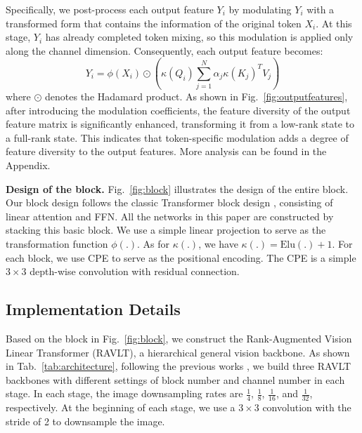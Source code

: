 \documentclass[10pt,twocolumn,letterpaper]{article}
\begin{document}
Specifically, we post-process each output feature $Y_i$ by modulating $Y_i$ with a transformed form that contains the information of the original token $X_i$. At this stage, $Y_i$ has already completed token mixing, so this modulation is applied only along the channel dimension. Consequently, each output feature becomes:
\begin{equation}
Y_i = \phi(X_i) \odot \left(\kappa(Q_i) \sum_{j=1}^{N} \alpha_j \kappa(K_j)^T V_j\right)
\label{eq:rala}
\end{equation}
where $\odot$ denotes the Hadamard product. As shown in Fig.~\ref{fig:outputfeatures}, after introducing the modulation coefficients, the feature diversity of the output feature matrix is significantly enhanced, transforming it from a low-rank state to a full-rank state. This indicates that token-specific modulation adds a degree of feature diversity to the output features. More analysis can be found in the Appendix.

\textbf{Design of the block.} Fig.~\ref{fig:block} illustrates the design of the entire block. Our block design follows the classic Transformer block design \cite{vaswani2017attention}, consisting of linear attention and FFN. All the networks in this paper are constructed by stacking this basic block. We use a simple linear projection to serve as the transformation function $\phi(.)$. As for $\kappa(.)$, we have $\kappa(.) = \mathrm{Elu}(.) + 1$. For each block, we use CPE \cite{chu2023conditional} to serve as the positional encoding. The CPE is a simple $3 \times 3$ depth-wise convolution with residual connection.

\subsection{Implementation Details}

Based on the block in Fig.~\ref{fig:block}, we construct the Rank-Augmented Vision Linear Transformer (RAVLT), a hierarchical general vision backbone. As shown in Tab.~\ref{tab:architecture}, following the previous works \cite{fan2023rmt,dosovitskiy2020image,zhu2023biformer}, we build three RAVLT backbones with different settings of block number and channel number in each stage. In each stage, the image downsampling rates are $\frac{1}{4}$, $\frac{1}{8}$, $\frac{1}{16}$, and $\frac{1}{32}$, respectively. At the beginning of each stage, we use a $3 \times 3$ convolution with the stride of 2 to downsample the image.
\end{document}
